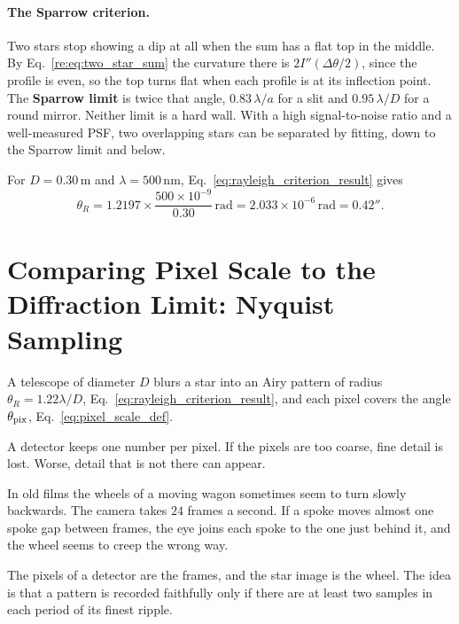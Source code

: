 \paragraph{The Sparrow criterion.} Two stars stop showing a dip at all when the sum has a flat top in the middle. By Eq.~\eqref{re:eq:two_star_sum} the curvature there is $2I''(\Delta\theta/2)$, since the profile is even, so the top turns flat when each profile is at its inflection point. The \textbf{Sparrow limit} is twice that angle, $0.83\,\lambda/a$ for a slit and $0.95\,\lambda/D$ for a round mirror. Neither limit is a hard wall. With a high signal-to-noise ratio and a well-measured PSF, two overlapping stars can be separated by fitting, down to the Sparrow limit and below.

\begin{example}
	For $D=0.30\,\mathrm m$ and $\lambda=500\,\mathrm{nm}$, Eq.~\eqref{eq:rayleigh_criterion_result} gives
	\[
	\theta_R = 1.2197\times\frac{500\times10^{-9}}{0.30}\,\mathrm{rad} = 2.033\times10^{-6}\,\mathrm{rad} = 0.42'' .
	\]
\end{example}

\section[Pixel Scale and Nyquist Sampling]{Comparing Pixel Scale to the Diffraction Limit: Nyquist Sampling}
\label{sec:sampling}

A telescope of diameter $D$ blurs a star into an Airy pattern of radius $\theta_R=1.22\lambda/D$, Eq.~\eqref{eq:rayleigh_criterion_result}, and each pixel covers the angle $\theta_{\rm pix}$, Eq.~\eqref{eq:pixel_scale_def}.

A detector keeps one number per pixel. If the pixels are too coarse, fine detail is lost. Worse, detail that is not there can appear.

In old films the wheels of a moving wagon sometimes seem to turn slowly backwards. The camera takes $24$ frames a second. If a spoke moves almost one spoke gap between frames, the eye joins each spoke to the one just behind it, and the wheel seems to creep the wrong way.

The pixels of a detector are the frames, and the star image is the wheel. The idea is that a pattern is recorded faithfully only if there are at least two samples in each period of its finest ripple.

